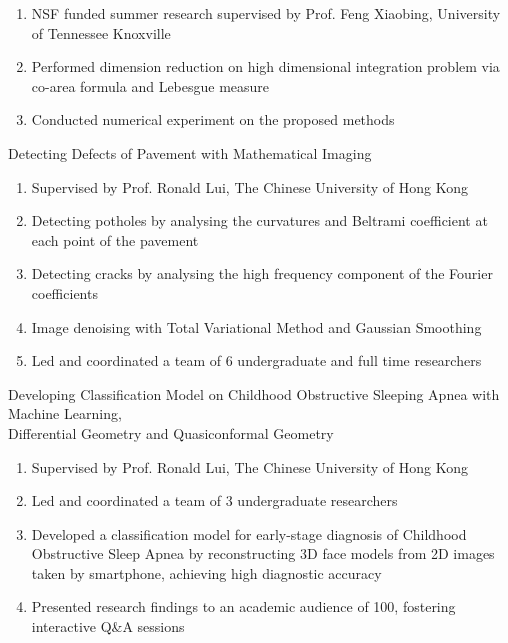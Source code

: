 \documentclass[11pt,letterpaper]{report}
\begin{document}
\begin{tablist}
        \begin{enumerate}
            \item NSF funded summer research supervised by Prof. Feng Xiaobing, University of Tennessee Knoxville
            \item Performed dimension reduction on high dimensional integration problem via co-area formula and Lebesgue measure
            \item Conducted numerical experiment on the proposed methods
        \end{enumerate}
        \vspace{1cm}
        \item[2021] Detecting Defects of Pavement with Mathematical Imaging
        \begin{enumerate}
            \item Supervised by Prof. Ronald Lui, The Chinese University of Hong Kong
            \item Detecting potholes by analysing the curvatures and Beltrami coefficient at each point of the pavement
            \item Detecting cracks by analysing the high frequency component of the Fourier coefficients
            \item Image denoising with Total Variational Method and Gaussian Smoothing
            \item Led and coordinated a team of 6 undergraduate and full time researchers
        \end{enumerate}
        \vspace{1cm}
        \item[2021] Developing Classification Model on Childhood Obstructive Sleeping Apnea with Machine Learning,\\ Differential Geometry and Quasiconformal Geometry
        \begin{enumerate}
            \item Supervised by Prof. Ronald Lui, The Chinese University of Hong Kong
            \item Led and coordinated a team of 3 undergraduate researchers
            \item Developed a classification model for early-stage diagnosis of Childhood Obstructive Sleep Apnea by reconstructing 3D face models from 2D images taken by smartphone, achieving high diagnostic accuracy
            \item Presented research findings to an academic audience of 100, fostering interactive Q\&A sessions


\end{enumerate}
\end{tablist}
\end{document}
